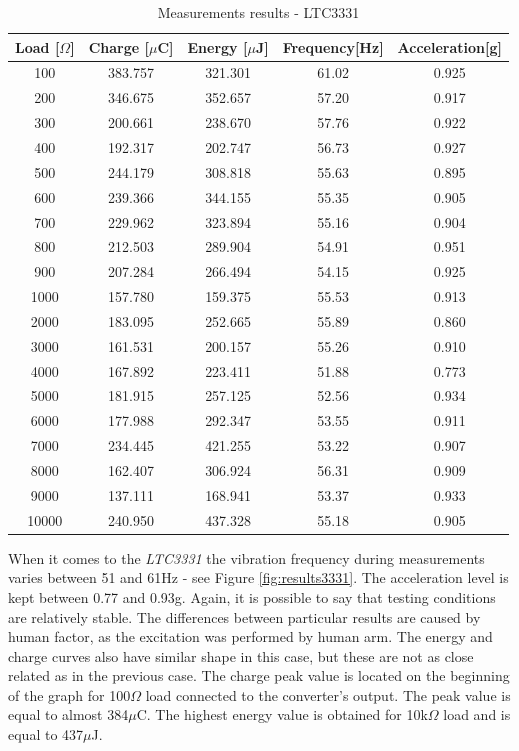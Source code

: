 \documentclass[12pt,a4paper]{article}
\begin{document}
\begin{table}[ht!]
\centering

\begin{tabular}{|c|c|c|c|c|}
    \hline
    \textbf{Load} [$\Omega$] & \textbf{Charge} [$\mu$C]& \textbf{Energy} [$\mu$J] & \textbf{Frequency}[Hz] & \textbf{Acceleration}[g] \\
    \hline
    100 & 383.757 & 321.301 & 61.02 & 0.925 \\
    \hline
    200 & 346.675 & 352.657 & 57.20 & 0.917 \\
    \hline
    300 & 200.661 & 238.670 & 57.76 & 0.922 \\
    \hline
    400 & 192.317 & 202.747 & 56.73 & 0.927 \\
    \hline
    500 & 244.179 & 308.818 & 55.63 & 0.895 \\
    \hline
    600 & 239.366 & 344.155 & 55.35 & 0.905 \\
    \hline
    700 & 229.962 & 323.894 & 55.16 & 0.904 \\
    \hline
    800 & 212.503 & 289.904 & 54.91 & 0.951 \\
    \hline
    900 & 207.284 & 266.494 & 54.15 & 0.925 \\
    \hline
    1000 & 157.780 & 159.375 & 55.53 & 0.913 \\
    \hline
    2000 & 183.095 & 252.665 & 55.89 & 0.860 \\
    \hline
    3000 & 161.531 & 200.157 & 55.26 & 0.910 \\
    \hline
    4000 & 167.892 & 223.411 & 51.88 & 0.773 \\
    \hline
    5000 & 181.915 & 257.125 & 52.56 & 0.934 \\
    \hline
    6000 & 177.988 & 292.347 & 53.55 & 0.911 \\
    \hline
    7000 & 234.445 & 421.255 & 53.22 & 0.907 \\
    \hline
    8000 & 162.407 & 306.924 & 56.31 & 0.909 \\
    \hline
    9000 & 137.111 & 168.941 & 53.37 & 0.933 \\
    \hline
    10000 & 240.950 & 437.328 & 55.18 & 0.905 \\
    \hline
\end{tabular}
\caption{Measurements results - LTC3331}
\label{tab:ltc3331results}
\end{table}
\par
\clearpage

When it comes to the \textit{LTC3331} the vibration frequency during measurements varies between 51 and 61Hz - see Figure \ref{fig:results3331}. The acceleration level is kept between 0.77 and 0.93g. Again, it is possible to say that testing conditions are relatively stable. The differences between particular results are caused by human factor, as the excitation was performed by human arm. The energy and charge curves also have similar shape in this case, but these are not as close related as in the previous case. The charge peak value is located on the beginning of the graph for 100$\Omega$ load connected to the converter's output. The peak value is equal to almost 384$\mu$C. The highest energy value is obtained for 10k$\Omega$ load and is equal to 437$\mu$J. 
\end{document}
